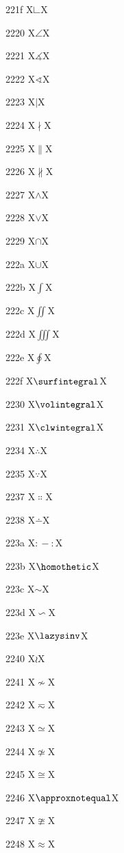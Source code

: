 \documentclass[11pt]{article}
\begin{document}
221f X{\ensuremath{\rightangle}}X

2220 X{\ensuremath{\angle}}X

2221 X{\ensuremath{\measuredangle}}X

2222 X{\ensuremath{\sphericalangle}}X

2223 X{\ensuremath{\mid}}X

2224 X{\ensuremath{\nmid}}X

2225 X{\ensuremath{\parallel}}X

2226 X{\ensuremath{\nparallel}}X

2227 X{\ensuremath{\wedge}}X

2228 X{\ensuremath{\vee}}X

2229 X{\ensuremath{\cap}}X

222a X{\ensuremath{\cup}}X

222b X{\ensuremath{\int}}X

222c X{\ensuremath{\iint}}X

222d X{\ensuremath{\iiint}}X

222e X{\ensuremath{\oint}}X

222f X{\ensuremath{\surfintegral}}X

2230 X{\ensuremath{\volintegral}}X

2231 X{\ensuremath{\clwintegral}}X

2234 X{\ensuremath{\therefore}}X

2235 X{\ensuremath{\because}}X

2237 X{\ensuremath{\Colon}}X

2238 X{\ensuremath{\dotminus}}X

223a X{\ensuremath{\mathbin{{:}\!\!{-}\!\!{:}}}}X

223b X{\ensuremath{\homothetic}}X

223c X{\ensuremath{\sim}}X

223d X{\ensuremath{\backsim}}X

223e X{\ensuremath{\lazysinv}}X

2240 X{\ensuremath{\wr}}X

2241 X{\ensuremath{\nsim}}X

2242 X{\ensuremath{\eqsim}}X

2243 X{\ensuremath{\simeq}}X

2244 X{\ensuremath{\nsimeq}}X

2245 X{\ensuremath{\cong}}X

2246 X{\ensuremath{\approxnotequal}}X

2247 X{\ensuremath{\ncong}}X

2248 X{\ensuremath{\approx}}X
\end{document}
